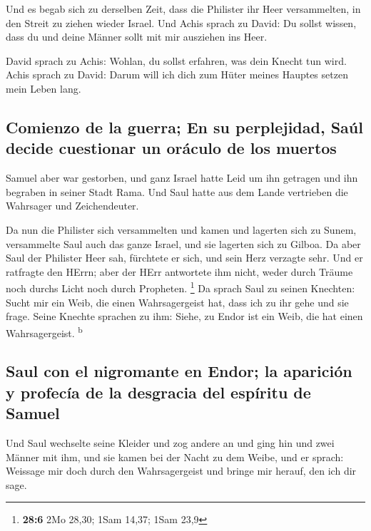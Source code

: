  Und es begab sich zu derselben Zeit, dass die Philister
ihr Heer versammelten, in den Streit zu ziehen wieder Israel. Und Achis
sprach zu David: Du sollst wissen, dass du und deine Männer sollt mit
mir ausziehen ins Heer.

 David sprach zu Achis: Wohlan, du sollst erfahren, was
dein Knecht tun wird. Achis sprach zu David: Darum will ich dich zum
Hüter meines Hauptes setzen mein Leben lang.

\hypertarget{comienzo-de-la-guerra-en-su-perplejidad-sauxfal-decide-cuestionar-un-oruxe1culo-de-los-muertos}{%
\subsection{Comienzo de la guerra; En su perplejidad, Saúl decide
cuestionar un oráculo de los
muertos}\label{comienzo-de-la-guerra-en-su-perplejidad-sauxfal-decide-cuestionar-un-oruxe1culo-de-los-muertos}}

 Samuel aber war gestorben, und ganz Israel hatte Leid um
ihn getragen und ihn begraben in seiner Stadt Rama. Und Saul hatte aus
dem Lande vertrieben die Wahrsager und Zeichendeuter.

 Da nun die Philister sich versammelten und kamen und
lagerten sich zu Sunem, versammelte Saul auch das ganze Israel, und sie
lagerten sich zu Gilboa.  Da aber Saul der Philister Heer
sah, fürchtete er sich, und sein Herz verzagte sehr.  Und
er ratfragte den HErrn; aber der HErr antwortete ihm nicht, weder durch
Träume noch durchs Licht noch durch Propheten. \footnote{\textbf{28:6}
  2Mo 28,30; 1Sam 14,37; 1Sam 23,9}  Da sprach Saul zu
seinen Knechten: Sucht mir ein Weib, die einen Wahrsagergeist hat, dass
ich zu ihr gehe und sie frage. Seine Knechte sprachen zu ihm: Siehe, zu
Endor ist ein Weib, die hat einen Wahrsagergeist. \textsuperscript{b}

\hypertarget{saul-con-el-nigromante-en-endor-la-apariciuxf3n-y-profecuxeda-de-la-desgracia-del-espuxedritu-de-samuel}{%
\subsection{Saul con el nigromante en Endor; la aparición y profecía de
la desgracia del espíritu de
Samuel}\label{saul-con-el-nigromante-en-endor-la-apariciuxf3n-y-profecuxeda-de-la-desgracia-del-espuxedritu-de-samuel}}

 Und Saul wechselte seine Kleider und zog andere an und
ging hin und zwei Männer mit ihm, und sie kamen bei der Nacht zu dem
Weibe, und er sprach: Weissage mir doch durch den Wahrsagergeist und
bringe mir herauf, den ich dir sage.

